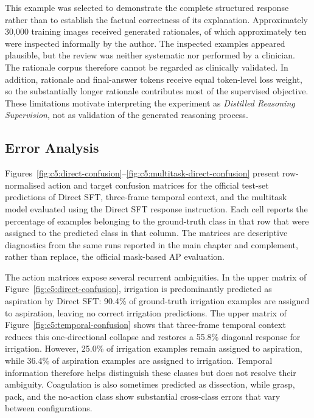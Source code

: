 This example was selected to demonstrate the complete structured response rather than to establish the factual correctness of its explanation. Approximately 30,000 training images received generated rationales, of which approximately ten were inspected informally by the author. The inspected examples appeared plausible, but the review was neither systematic nor performed by a clinician. The rationale corpus therefore cannot be regarded as clinically validated. In addition, rationale and final-answer tokens receive equal token-level loss weight, so the substantially longer rationale contributes most of the supervised objective. These limitations motivate interpreting the experiment as \emph{Distilled Reasoning Supervision}, not as validation of the generated reasoning process.

\fi
\ifcFiveErrorAnalysis
\subsection{Error Analysis}
\label{sec:c5:appendix-error-analysis}

Figures~\ref{fig:c5:direct-confusion}--\ref{fig:c5:multitask-direct-confusion} present row-normalised action and target confusion matrices for the official test-set predictions of Direct SFT, three-frame temporal context, and the multitask model evaluated using the Direct SFT response instruction. Each cell reports the percentage of examples belonging to the ground-truth class in that row that were assigned to the predicted class in that column. The matrices are descriptive diagnostics from the same runs reported in the main chapter and complement, rather than replace, the official mask-based AP evaluation.

The action matrices expose several recurrent ambiguities. In the upper matrix of Figure~\ref{fig:c5:direct-confusion}, irrigation is predominantly predicted as aspiration by Direct SFT: 90.4\% of ground-truth irrigation examples are assigned to aspiration, leaving no correct irrigation predictions. The upper matrix of Figure~\ref{fig:c5:temporal-confusion} shows that three-frame temporal context reduces this one-directional collapse and restores a 55.8\% diagonal response for irrigation. However, 25.0\% of irrigation examples remain assigned to aspiration, while 36.4\% of aspiration examples are assigned to irrigation. Temporal information therefore helps distinguish these classes but does not resolve their ambiguity. Coagulation is also sometimes predicted as dissection, while grasp, pack, and the no-action class show substantial cross-class errors that vary between configurations.

